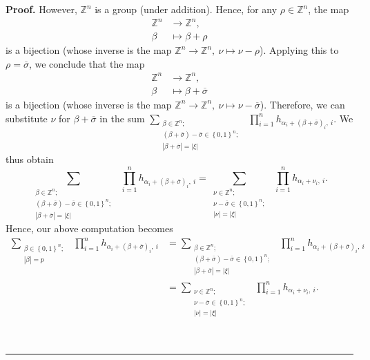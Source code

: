 \documentclass[numbers=enddot,12pt,final,onecolumn,notitlepage,english]{scrartcl}%
\theoremstyle{definition}
\newenvironment{proof}[1][Proof]{\noindent\textbf{#1.} }{\ \rule{0.5em}{0.5em}}
\let\sumnonlimits\sum
\let\prodnonlimits\prod
\renewcommand{\sum}{\sumnonlimits\limits}
\renewcommand{\prod}{\prodnonlimits\limits}
\newenvironment{verlong}{}{}
\begin{document}
\begin{verlong}
\begin{proof}
However, $\mathbb{Z}^{n}$ is a group (under addition). Hence, for any $\rho
\in\mathbb{Z}^{n}$, the map%
\begin{align*}
\mathbb{Z}^{n}  &  \rightarrow\mathbb{Z}^{n},\\
\beta &  \mapsto\beta+\rho
\end{align*}
is a bijection (whose inverse is the map $\mathbb{Z}^{n}\rightarrow
\mathbb{Z}^{n},\ \nu\mapsto\nu-\rho$). Applying this to $\rho=\overline
{\sigma}$, we conclude that the map
\begin{align*}
\mathbb{Z}^{n}  &  \rightarrow\mathbb{Z}^{n},\\
\beta &  \mapsto\beta+\overline{\sigma}%
\end{align*}
is a bijection (whose inverse is the map $\mathbb{Z}^{n}\rightarrow
\mathbb{Z}^{n},\ \nu\mapsto\nu-\overline{\sigma}$). Therefore, we can
substitute $\nu$ for $\beta+\overline{\sigma}$ in the sum $\sum
_{\substack{\beta\in\mathbb{Z}^{n};\\\left(  \beta+\overline{\sigma}\right)
-\overline{\sigma}\in\left\{  0,1\right\}  ^{n};\\\left\vert \beta
+\overline{\sigma}\right\vert =\left\vert \xi\right\vert }}\ \ \prod_{i=1}%
^{n}h_{\alpha_{i}+\left(  \beta+\overline{\sigma}\right)  _{i},\ i}$. We thus
obtain%
\[
\sum_{\substack{\beta\in\mathbb{Z}^{n};\\\left(  \beta+\overline{\sigma
}\right)  -\overline{\sigma}\in\left\{  0,1\right\}  ^{n};\\\left\vert
\beta+\overline{\sigma}\right\vert =\left\vert \xi\right\vert }}\ \ \prod
_{i=1}^{n}h_{\alpha_{i}+\left(  \beta+\overline{\sigma}\right)  _{i},\ i}%
=\sum_{\substack{\nu\in\mathbb{Z}^{n};\\\nu-\overline{\sigma}\in\left\{
0,1\right\}  ^{n};\\\left\vert \nu\right\vert =\left\vert \xi\right\vert
}}\ \ \prod_{i=1}^{n}h_{\alpha_{i}+\nu_{i},\ i}.
\]
Hence, our above computation becomes%
\begin{align}
\sum_{\substack{\beta\in\left\{  0,1\right\}  ^{n};\\\left\vert \beta
\right\vert =p}}\ \ \prod_{i=1}^{n}h_{\alpha_{i}+\left(  \beta+\overline
{\sigma}\right)  _{i},\ i}  &  =\sum_{\substack{\beta\in\mathbb{Z}%
^{n};\\\left(  \beta+\overline{\sigma}\right)  -\overline{\sigma}\in\left\{
0,1\right\}  ^{n};\\\left\vert \beta+\overline{\sigma}\right\vert =\left\vert
\xi\right\vert }}\ \ \prod_{i=1}^{n}h_{\alpha_{i}+\left(  \beta+\overline
{\sigma}\right)  _{i},\ i}\nonumber\\
&  =\sum_{\substack{\nu\in\mathbb{Z}^{n};\\\nu-\overline{\sigma}\in\left\{
0,1\right\}  ^{n};\\\left\vert \nu\right\vert =\left\vert \xi\right\vert
}}\ \ \prod_{i=1}^{n}h_{\alpha_{i}+\nu_{i},\ i}.
\label{pf.thm.pre-pieri2.innersum}%
\end{align}



\end{proof}
\end{verlong}
\end{document}
